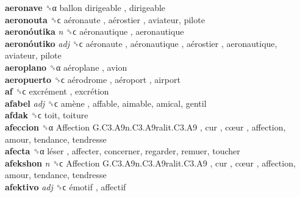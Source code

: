 \textbf{aeronave} ␝α   ballon dirigeable , dirigeable  \\
\textbf{aeronouta} ␝ϲ   aéronaute ,  aérostier , aviateur, pilote  \\
\textbf{aeronóutika} \emph{n}  ␝ϲ   aéronautique , aeronautique  \\
\textbf{aeronóutiko} \emph{adj}  ␝ϲ   aéronaute ,  aéronautique ,  aérostier , aeronautique, aviateur, pilote  \\
\textbf{aeroplano} ␝α   aéroplane , avion  \\
\textbf{aeropuerto} ␝ϲ   aérodrome ,  aéroport , airport  \\
\textbf{af} ␝ϲ   excrément ,  excrétion   \\
\textbf{afabel} \emph{adj}  ␝ϲ   amène , affable, aimable, amical, gentil  \\
\textbf{afdak} ␝ϲ  toit, toiture  \\
\textbf{afeccion} ␝α   Affection G.C3.A9n.C3.A9ralit.C3.A9 ,  cur ,  cœur , affection, amour, tendance, tendresse  \\
\textbf{afecta} ␝α   léser , affecter, concerner, regarder, remuer, toucher  \\
\textbf{afekshon} \emph{n}  ␝ϲ   Affection G.C3.A9n.C3.A9ralit.C3.A9 ,  cur ,  cœur , affection, amour, tendance, tendresse  \\
\textbf{afektivo} \emph{adj}  ␝ϲ   émotif , affectif  \\
